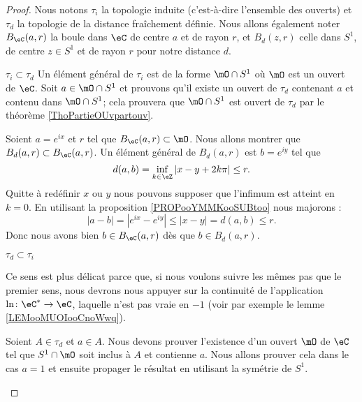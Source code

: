 \begin{proof}
    Nous notons \( \tau_i\) la topologie induite (c'est-à-dire l'ensemble des ouverts) et \( \tau_d\) la topologie de la distance fraîchement définie. Nous allons également noter \( B_{\eC}(a,r)\) la boule dans \( \eC\) de centre \( a\) et de rayon \( r\), et \( B_d(z,r)\) celle dans \( S^1\), de centre \( z\in S^1\) et de rayon \( r\) pour notre distance \( d\).
    \begin{subproof}
        
    \item[\( \tau_i\subset\tau_d\)]
        Un élément général de \( \tau_i\) est de la forme \( \mO\cap S^1\) où \( \mO\) est un ouvert de \( \eC\). Soit \( a\in \mO\cap S^1\) et prouvons qu'il existe un ouvert de \( \tau_d\) contenant \( a\) et contenu dans \( \mO\cap S^1\); cela prouvera que \( \mO\cap S^1\) est ouvert de \( \tau_d\) par le théorème \ref{ThoPartieOUvpartouv}.

        Soient \( a= e^{ix}\) et \( r\) tel que \( B_{\eC}(a,r)\subset \mO\). Nous allons montrer que \( B_{d}(a,r)\subset B_{\eC}(a,r)\). Un élément général de \( B_d(a,r)\) est \( b= e^{iy}\) tel que
        \begin{equation}
            d(a,b)=\inf_{k\in \eZ}| x-y+2k\pi |\leq r.
        \end{equation}
        Quitte à redéfinir \( x\) ou \( y\) nous pouvons supposer que l'infimum est atteint en \( k=0\). En utilisant la proposition \ref{PROPooYMMKooSUBtoo} nous majorons :
        \begin{equation}
            | a-b |=|  e^{ix}- e^{iy} |\leq | x-y |=d(a,b)\leq r.
        \end{equation}
        Donc nous avons bien \( b\in B_{\eC}(a,r)\) dès que \( b\in B_d(a,r)\).

    \item[\( \tau_d\subset \tau_i\)]

        Ce sens est plus délicat parce que, si nous voulons suivre les mêmes pas que le premier sens, nous devrons nous appuyer sur la continuité de l'application \( \ln\colon \eC^*\to \eC\), laquelle n'est pas vraie en \( -1\) (voir par exemple le lemme \ref{LEMooMUOIooCnoWwq}).

        Soient \( A\in \tau_d\) et \( a\in A\). Nous devons prouver l'existence d'un ouvert \( \mO\) de \( \eC\) tel que \( S^1\cap\mO\) soit inclus à \( A\) et contienne \( a\). Nous allons prouver cela dans le cas \( a=1\) et ensuite propager le résultat en utilisant la symétrie de \( S^1\).


\end{subproof}
\end{proof}
